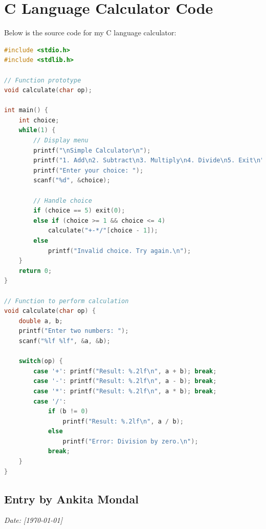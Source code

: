 \documentclass[12pt, a4paper]{article}
\begin{document}
\section*{C Language Calculator Code}
Below is the source code for my C language calculator:
\vspace{0.8cm}
\begin{lstlisting}[language=C, caption=C Calculator Code]
#include <stdio.h>
#include <stdlib.h>

// Function prototype
void calculate(char op);

int main() {
    int choice;
    while(1) {
        // Display menu
        printf("\nSimple Calculator\n");
        printf("1. Add\n2. Subtract\n3. Multiply\n4. Divide\n5. Exit\n");
        printf("Enter your choice: ");
        scanf("%d", &choice);

        // Handle choice
        if (choice == 5) exit(0);
        else if (choice >= 1 && choice <= 4) 
            calculate("+-*/"[choice - 1]);
        else 
            printf("Invalid choice. Try again.\n");
    }
    return 0;
}

// Function to perform calculation
void calculate(char op) {
    double a, b;
    printf("Enter two numbers: ");
    scanf("%lf %lf", &a, &b);

    switch(op) {
        case '+': printf("Result: %.2lf\n", a + b); break;
        case '-': printf("Result: %.2lf\n", a - b); break;
        case '*': printf("Result: %.2lf\n", a * b); break;
        case '/': 
            if (b != 0) 
                printf("Result: %.2lf\n", a / b);
            else 
                printf("Error: Division by zero.\n");
            break;
    }
}

\end{lstlisting}
\newpage
{}
\vspace{-2cm}
\subsection*{Entry by Ankita Mondal}
\textit{Date: [\today]}\\

\newpage
{}
\vspace{-2cm}
\end{document}
